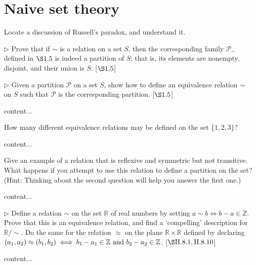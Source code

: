 \section{Naive set theory}
\extitle
\begin{exercise}
	Locate a discussion of Russell's paradox, and understand it.
\end{exercise}
\begin{solution}
\end{solution}
\begin{exercise}
	$\triangleright$ Prove that if $\sim$ is a relation on a set $S$, then the corresponding family $\mathscr{P}_{\sim}$ defined in $\S1.5$  is indeed a partition of $S$: that is, its elements are nonempty, disjoint, and their union is $S$. [$\S1.5$]
\end{exercise}
\begin{solution}
\end{solution}
\begin{exercise}
	$\triangleright$ Given a partition $\mathscr{P}$ on a set $S$, show how to define an equivalence relation $\sim$ on $S$ such that $\mathscr{P}$ is the corresponding partition. [$\S1.5$]
\end{exercise}
\begin{solution}
	content...
\end{solution}
\begin{exercise}
	How many different equivalence relations may be defined on the set $\{1,2,3\}$?
\end{exercise}
\begin{solution}
	content...
\end{solution}
\begin{exercise}
	Give an example of a relation that is reflexive and symmetric but not transitive. What happens if you attempt to use this relation to define a partition on the set? (Hint: Thinking about the second question will help you answer the first one.)
\end{exercise}
\begin{solution}
	content...
\end{solution}
\begin{exercise}
	$\triangleright$ Define a relation $\sim$ on the set $\mathbb{R}$ of real numbers by setting $a \sim b \iff b-a\in \mathbb{Z}$. Prove that this is an equivalence relation, and find a `compelling' description for $\mathbb{R}/{\sim}$. Do the same for the relation $\approx$ on the plane $\mathbb{R} \times \mathbb{R}$ defined by declaring $(a_1,a_2) \approx (b_1,b_2) \iff b_1 - a_1 \in \mathbb{Z}\textnormal{ and }b_2 - a_2\in\mathbb{Z}$. [$\S \RN{2}.8.1,\RN{2}.8.10$]
\end{exercise}
\begin{solution}
	content...
\end{solution}